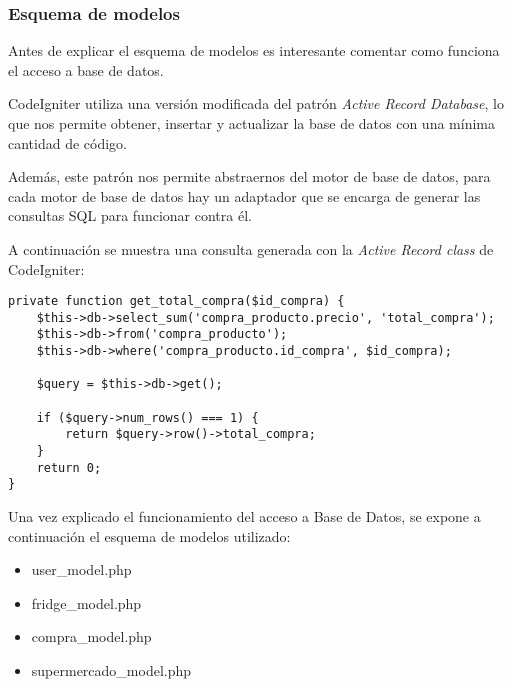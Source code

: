     \subsubsection{Esquema de modelos}

        Antes de explicar el esquema de modelos es interesante comentar como funciona el acceso a base de datos.

        CodeIgniter utiliza una versión modificada del patrón \emph{Active Record Database}, lo que nos permite obtener, insertar y actualizar la base de datos con una mínima cantidad de código.

        Además, este patrón nos permite abstraernos del motor de base de datos, para cada motor de base de datos hay un adaptador que se encarga de generar las consultas SQL para funcionar contra él.

        A continuación se muestra una consulta generada con la \emph{Active Record class} de CodeIgniter:

        \begin{lstlisting}
private function get_total_compra($id_compra) {
    $this->db->select_sum('compra_producto.precio', 'total_compra');
    $this->db->from('compra_producto');
    $this->db->where('compra_producto.id_compra', $id_compra);

    $query = $this->db->get();

    if ($query->num_rows() === 1) {
        return $query->row()->total_compra;
    }
    return 0;
}
        \end{lstlisting}

        Una vez explicado el funcionamiento del acceso a Base de Datos, se expone a continuación el esquema de modelos utilizado:

        \begin{itemize}
            \item user\_model.php
            \item fridge\_model.php
            \item compra\_model.php
            \item supermercado\_model.php
        \end{itemize}